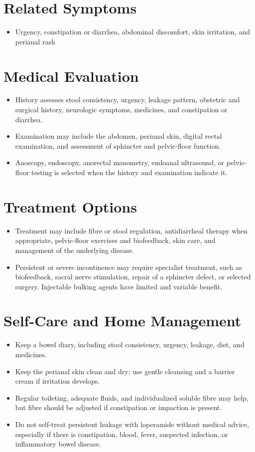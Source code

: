 \section*{Related Symptoms}
\begin{itemize}
 \item Urgency, constipation or diarrhea, abdominal discomfort, skin irritation, and perianal rash
\end{itemize}


\section*{Medical Evaluation}
\begin{itemize}
 \item History assesses stool consistency, urgency, leakage pattern, obstetric and surgical history, neurologic symptoms, medicines, and constipation or diarrhea.
 \item Examination may include the abdomen, perianal skin, digital rectal examination, and assessment of sphincter and pelvic-floor function.
 \item Anoscopy, endoscopy, anorectal manometry, endoanal ultrasound, or pelvic-floor testing is selected when the history and examination indicate it.
\end{itemize}

\section*{Treatment Options}
\begin{itemize}
 \item Treatment may include fibre or stool regulation, antidiarrheal therapy when appropriate, pelvic-floor exercises and biofeedback, skin care, and management of the underlying disease.
 \item Persistent or severe incontinence may require specialist treatment, such as biofeedback, sacral nerve stimulation, repair of a sphincter defect, or selected surgery. Injectable bulking agents have limited and variable benefit.
\end{itemize}

\section*{Self-Care and Home Management}
\begin{itemize}
 \item Keep a bowel diary, including stool consistency, urgency, leakage, diet, and medicines.
 \item Keep the perianal skin clean and dry; use gentle cleansing and a barrier cream if irritation develops.
 \item Regular toileting, adequate fluids, and individualized soluble fibre may help, but fibre should be adjusted if constipation or impaction is present.
 \item Do not self-treat persistent leakage with loperamide without medical advice, especially if there is constipation, blood, fever, suspected infection, or inflammatory bowel disease.
\end{itemize}

